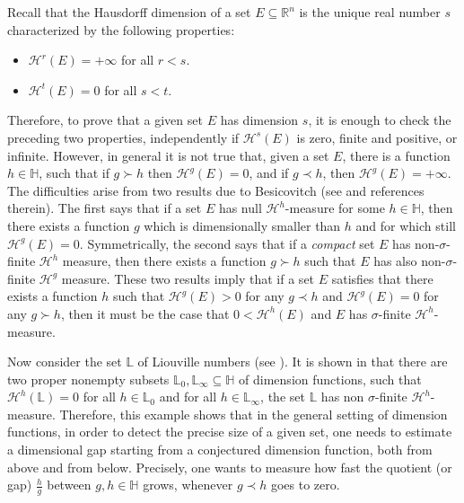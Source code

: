 \documentclass[11pt,a4paper]{amsart}
\begin{document}
Recall that the Hausdorff dimension of a set $E{\subseteq}{\mathbb{R}}^n$ is the
unique real number $s$ characterized by the following properties:
\begin{itemize}
 \item ${\mathcal{H}^{{r}}}(E)=+\infty$ for all $r<s$.
 \item ${\mathcal{H}^{{t}}}(E)=0$ for all $s<t$.
\end{itemize}
Therefore, to prove that a given set   $E$ has dimension $s$, it is
enough to  check the preceding two properties, independently if
${\mathcal{H}^{{s}}}(E)$ is zero, finite and positive, or infinite. However,
in general it is not true that, given a set $E$, there is a
function $h\in{\mathbb{H}}$, such that if $g\succ h$ then
${\mathcal{H}^{{g}}}(E)=0$, and if $g\prec h$, then ${\mathcal{H}^{{g}}}(E)=+\infty$.
The difficulties arise from two results due to Besicovitch  (see
\cite{rog98} and references therein). The first says that if a set
$E$ has null ${\mathcal{H}^{{h}}}$-measure for some $h\in{\mathbb{H}}$, then there
exists a function  $g$ which is dimensionally smaller than $h$ and for which still ${\mathcal{H}^{{g}}}(E)=0$.
Symmetrically, the second says that if a \emph{compact} set $E$
has non-$\sigma$-finite ${\mathcal{H}^{{h}}}$ measure, then there exists a
function $g\succ h$ such that $E$ has also non-$\sigma$-finite
${\mathcal{H}^{{g}}}$ measure. These two results imply that if a set $E$
satisfies that there exists a function  $h$ such that
${\mathcal{H}^{{g}}}(E)>0$ for any $g\prec h$ and ${\mathcal{H}^{{g}}}(E)=0$ for any
$g\succ h$, then it must be the case that
$0<{\mathcal{H}^{{h}}}(E)$ and $E$ has $\sigma$-finite ${\mathcal{H}^{{h}}}$-measure. 

Now consider the set ${\mathbb{L}}$ of Liouville numbers (see \cite{ek06}). It is shown in \cite{or06} that there are two proper nonempty subsets ${\mathbb{L}}_0, {\mathbb{L}}_\infty{\subseteq}{\mathbb{H}}$  of dimension functions, such that ${\mathcal{H}^{{h}}}({\mathbb{L}})=0$ for all $h\in{\mathbb{L}}_0$ and for all $h\in{\mathbb{L}}_\infty$, the set ${\mathbb{L}}$ has non $\sigma$-finite ${\mathcal{H}^{{h}}}$-measure. Therefore, this example shows that in the general setting of dimension functions, in order  to detect the precise size of a given set, one needs to estimate a dimensional gap starting from a conjectured dimension function, both from above and from below. Precisely, one wants to measure how fast the quotient  (or gap) $\frac{h}{g}$ between $g, h\in{\mathbb{H}}$ grows, whenever $g\prec h$ goes to zero.
\end{document}
